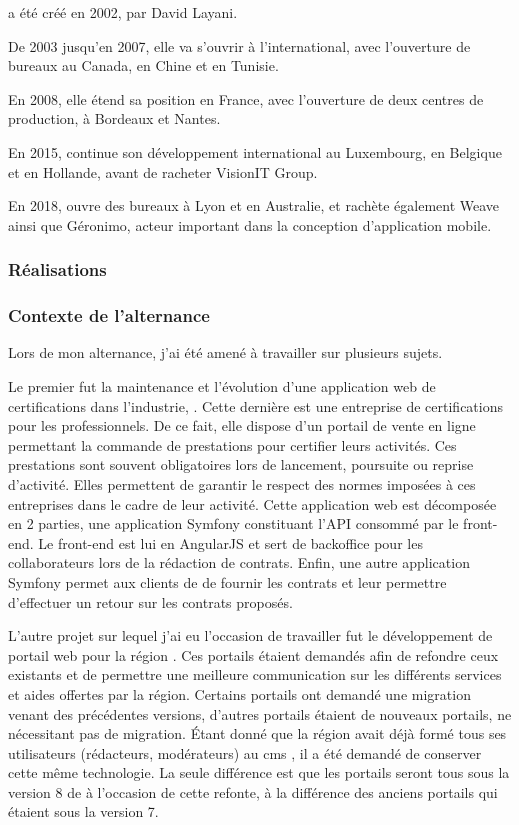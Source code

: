 \xmakefirstuc{\onepoint{}} a été créé en 2002, par David Layani.

De 2003 jusqu'en 2007, elle va s'ouvrir à l'international, avec l'ouverture de bureaux au Canada, en Chine et en Tunisie.

En 2008, elle étend sa position en France, avec l'ouverture de deux centres de production, à Bordeaux et Nantes.

En 2015, \onepoint{} continue son développement international au Luxembourg, en Belgique et en Hollande, avant de racheter VisionIT Group.

En 2018, \onepoint{} ouvre des bureaux à Lyon et en Australie, et rachète également Weave ainsi que Géronimo, acteur important dans la conception d'application mobile.

\subsubsection{Réalisations}


\subsubsection{Contexte de l'alternance}

Lors de mon alternance, j'ai été amené à travailler sur plusieurs sujets.

Le premier fut la maintenance et l'évolution d'une application web de certifications dans l'industrie, \bv. Cette dernière est une entreprise de certifications pour les professionnels. De ce fait, elle dispose d’un portail de vente en ligne permettant la commande de prestations pour certifier leurs activités. Ces prestations sont souvent obligatoires lors de lancement, poursuite ou reprise d'activité. Elles permettent de garantir le respect des normes imposées à ces entreprises dans le cadre de leur activité. Cette application web est décomposée en 2 parties, une application Symfony constituant l'API consommé par le front-end. Le front-end est lui en AngularJS et sert de backoffice pour les collaborateurs \bv{} lors de la rédaction de contrats. Enfin, une autre application Symfony permet aux clients de \bv{} de fournir les contrats et leur permettre d'effectuer un retour sur les contrats proposés.

L'autre projet sur lequel j'ai eu l'occasion de travailler fut le développement de portail web pour la région \naq{}. Ces portails étaient demandés afin de refondre ceux existants et de permettre une meilleure communication sur les différents services et aides offertes par la région. Certains portails ont demandé une migration venant des précédentes versions, d'autres portails étaient de nouveaux portails, ne nécessitant pas de migration. Étant donné que la région avait déjà formé tous ses utilisateurs (rédacteurs, modérateurs) au \gls{cms} \drupal, il a été demandé de conserver cette même technologie. La seule différence est que les portails seront tous sous la version 8 de \drupal{} à l'occasion de cette refonte, à la différence des anciens portails qui étaient sous la version 7.

